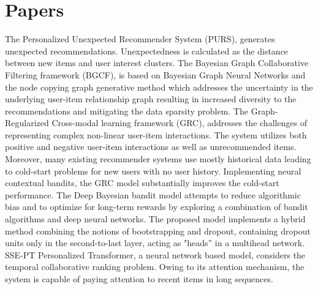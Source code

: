 \section{Papers}
The Personalized Unexpected Recommender System (PURS), generates unexpected recommendations.  Unexpectedness is calculated as the distance between new items and user interest clusters. The Bayesian Graph Collaborative Filtering framework (BGCF), is based on Bayesian Graph Neural Networks and the node copying graph generative method which addresses the uncertainty in the underlying user-item relationship graph resulting in increased diversity to the recommendations and mitigating the data sparsity problem. The Graph-Regularized Cross-modal learning framework (GRC), addresses the challenges of representing complex non-linear user-item interactions. The system utilizes both positive and negative user-item interactions as well as unrecommended items. Moreover, many existing recommender systems use mostly historical data leading to cold-start problems for new users with no user history. Implementing neural contextual bandits, the GRC model substantially improves the cold-start performance. The Deep Bayesian bandit model attempts to reduce algorithmic bias and to optimize for long-term rewards by exploring a combination of bandit algorithms and deep neural networks. The proposed model implements a hybrid method combining the notions of bootstrapping and dropout, containing dropout units only in the second-to-last layer, acting as "heads” in a multihead network.
SSE-PT Personalized Transformer, a neural network based model,  considers the temporal collaborative ranking problem. Owing to its attention mechanism, the system is capable of paying attention to recent items in long sequences.

